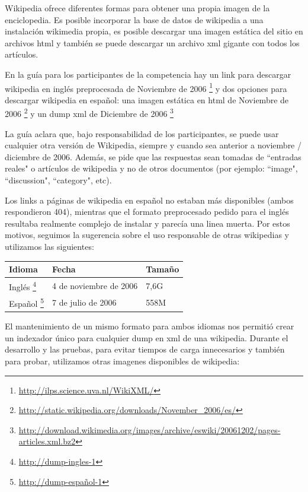 Wikipedia ofrece diferentes formas para obtener una propia imagen de la enciclopedia.
Es posible incorporar la base de datos de wikipedia a una instalación wikimedia
propia, es posible descargar una imagen estática del sitio en archivos html y también se puede
descargar un archivo xml gigante con todos los artículos. 

En la guía para los participantes de la competencia \cite{GuidelineClef07} hay un link para descargar 
wikipedia en inglés preprocesada de Noviembre de 2006 \footnote{\url{http://ilps.science.uva.nl/WikiXML/}} y dos opciones para descargar wikipedia en español: una imagen estática en html de Noviembre de 2006 \footnote{\url{http://static.wikipedia.org/downloads/November_2006/es/}} y un dump xml de Diciembre de 2006 
\footnote{\url{http://download.wikimedia.org/images/archive/eswiki/20061202/pages-articles.xml.bz2}}

La guía aclara que, bajo responsabilidad de los participantes, se puede usar
cualquier otra versión de Wikipedia, siempre y cuando sea anterior a noviembre / diciembre de 2006.
Además, se pide que las respuestas sean tomadas de ``entradas reales" o artículos de wikipedia y
no de otros documentos (por ejemplo: ``image", ``discussion", ``category", etc).

Los links a páginas de wikipedia en español no estaban más disponibles (ambos respondieron 404), mientras que el formato
preprocesado pedido para el inglés resultaba realmente complejo de instalar y parecía una linea muerta. Por estos motivos,
seguimos la sugerencia sobre el uso responsable de otras wikipedias y utilizamos las siguientes:

\medskip

\begin{center}
\begin{tabular}{ | l | l | l |}
    \hline
    Idioma & Fecha & Tamaño\\ \hline
    Inglés \footnote{\url{http://dump-ingles-1}} & 4 de noviembre de 2006 & 7,6G \\ \hline
    Español \footnote{\url{http://dump-español-1}} & 7 de julio de 2006 & 558M \\ \hline
\end{tabular}  
\end{center}

El mantenimiento de un mismo formato para ambos idiomas nos permitió crear un indexador único para cualquier
dump en xml de una wikipedia. Durante el desarrollo y las pruebas, para evitar tiempos de carga innecesarios y también
para probar, utilizamos otras imagenes disponibles de wikipedia:

